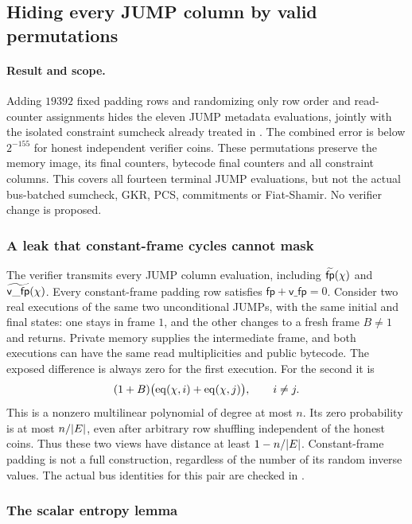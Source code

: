 \subsection{Hiding every JUMP column by valid permutations}\label{note:zk-jump-metadata}

\paragraph{Result and scope.} Adding $19392$ fixed padding rows and randomizing only row order and read-counter assignments hides the eleven JUMP metadata evaluations, jointly with the isolated constraint sumcheck already treated in . The combined error is below $2^{-155}$ for honest independent verifier coins. These permutations preserve the memory image, its final counters, bytecode final counters and all constraint columns. This covers all fourteen terminal JUMP evaluations, but not the actual bus-batched sumcheck, GKR, PCS, commitments or Fiat-Shamir. No verifier change is proposed.

\subsubsection{A leak that constant-frame cycles cannot mask}

The verifier transmits every JUMP column evaluation, including $\widetilde{\mathsf{fp}}(\chi)$ and $\widetilde{\mathsf{v\_fp}}(\chi)$. Every constant-frame padding row satisfies $\mathsf{fp}+\mathsf{v\_fp}=0$. Consider two real executions of the same two unconditional JUMPs, with the same initial and final states: one stays in frame $1$, and the other changes to a fresh frame $B\ne1$ and returns. Private memory supplies the intermediate frame, and both executions can have the same read multiplicities and public bytecode. The exposed difference is always zero for the first execution. For the second it is
\[
 (1+B)\bigl(\operatorname{eq}(\chi,i)+\operatorname{eq}(\chi,j)\bigr),\qquad i\ne j.
\]
This is a nonzero multilinear polynomial of degree at most $n$. Its zero probability is at most $n/|E|$, even after arbitrary row shuffling independent of the honest coins. Thus these two views have distance at least $1-n/|E|$. Constant-frame padding is not a full construction, regardless of the number of its random inverse values. The actual bus identities for this pair are checked in .

\subsubsection{The scalar entropy lemma}


